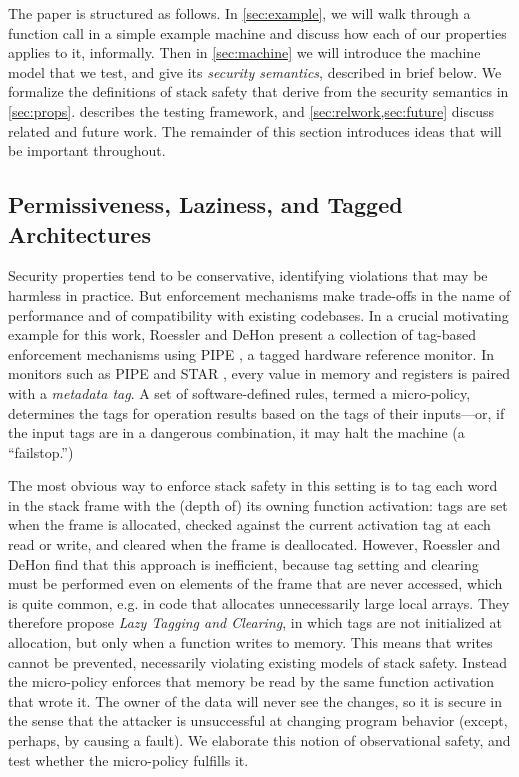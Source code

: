The paper is structured as follows. In \cref{sec:example}, we will walk through a function
call in a simple example machine and discuss how each of our properties applies to it,
informally. Then in \cref{sec:machine} we will introduce the machine model that we test, and give
its {\em security semantics}, described in brief below. We formalize the definitions of
stack safety that derive from the security semantics in \cref{sec:props}.
 describes the testing framework, and
\cref{sec:relwork,sec:future} discuss related and future work.
The remainder of this section introduces ideas that will be important throughout.
%

\subsection{Permissiveness, Laziness, and Tagged Architectures}

Security properties tend to be conservative, identifying violations that may be
harmless in practice. But enforcement mechanisms make trade-offs in the name of performance
and of compatibility with existing codebases. In a crucial motivating example for this work,
Roessler and DeHon \cite{} present a collection of tag-based enforcement mechanisms
using PIPE \cite{???}, a tagged hardware reference monitor. In monitors such as PIPE and
STAR \cite{???},  every value in memory and registers is paired with a {\em metadata tag}.
A set of software-defined rules, termed a micro-policy, determines the tags for operation
results based on the tags of their inputs---or, if the input tags are in a dangerous
combination, it may halt the machine (a ``failstop.'')

The most obvious way to enforce stack safety in this setting is to tag each word
in the stack frame with the (depth of) its owning function activation: tags are
set when the frame is allocated, checked against the current activation tag at each read or write,
and cleared when the frame is deallocated. 
However, Roessler and DeHon find that this approach is inefficient, because tag setting
and clearing must be performed even on elements of the frame that are never accessed,
which is quite common, e.g. in code that allocates unnecessarily large local arrays.
They therefore propose
{\em Lazy Tagging and Clearing}, in which tags are not initialized at allocation, but only
when a function writes to memory. This means that writes cannot be prevented, necessarily
violating existing models of stack safety.  Instead the micro-policy enforces that memory be
read by the same function activation that wrote it. The owner of the data will never see the changes,
so it is secure in the sense that the attacker is unsuccessful at changing program behavior
(except, perhaps, by causing a fault). We elaborate this notion of observational safety, and test whether the
micro-policy fulfills it.

